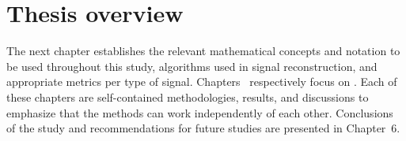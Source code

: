 \section{Thesis overview}
\label{sec:overview}
The next chapter establishes the relevant mathematical concepts and notation to be used throughout this study, algorithms used in signal reconstruction, and appropriate metrics per type of signal.  Chapters~ respectively focus on . Each of these chapters are self-contained methodologies, results, and discussions to emphasize that the methods can work independently of each other. Conclusions of the study and recommendations for future studies are presented in Chapter~6.